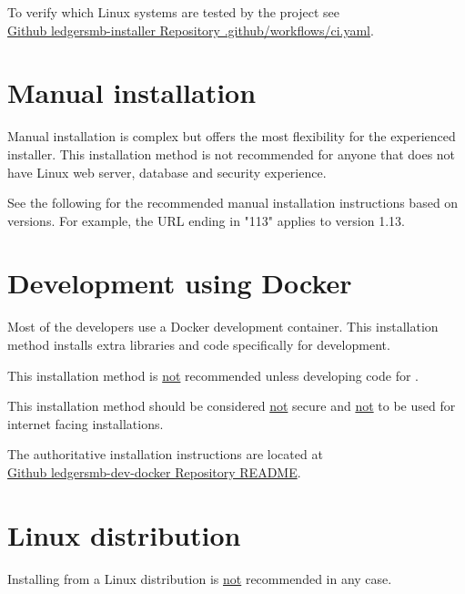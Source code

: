 To verify which Linux systems are tested by the project see \\
\href{https://github.com/ledgersmb/ledgersmb-installer/blob/main/.github/workflows/ci.yaml}{Github ledgersmb-installer Repository .github/workflows/ci.yaml}.

\section{Manual installation}
\label{sec-installation-manual}

Manual installation is complex but offers the most flexibility for the experienced installer.  
This installation method is not recommended for anyone that does not have Linux web server, database and security experience.

See the following for the recommended manual installation instructions based on \lsmbsp versions. 
For example, the URL ending in "113" applies to \lsmbsp version 1.13.




\section{Development using Docker}
\label{sec-installation-docker-development}

Most of the developers use a Docker development container. 
This installation method installs extra libraries and code specifically for development. 

This installation method is \underline{not} recommended unless developing code for \lsmb. 

This installation method should be considered \underline{not} secure and \underline{not} to be used for internet facing installations.

The authoritative installation instructions are located at \\
\href{https://github.com/ledgersmb/ledgersmb-dev-docker/blob/master/README.md}{Github ledgersmb-dev-docker Repository README}.

\section{Linux distribution}
\label{sec-installation-linux-distribution}

Installing from a Linux distribution is \underline{not} recommended in any case.


